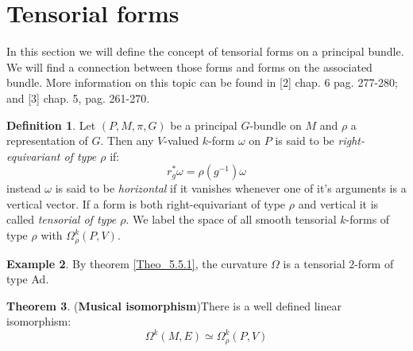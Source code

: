\documentclass[12pt,a4paper]{report}
\theoremstyle{definition}
\newtheorem{Def}{Definition}[chapter]
\theoremstyle{Theorem}
\newtheorem{Theo}[Def]{Theorem}
\theoremstyle{definition}
\newtheorem{Ex}[Def]{Example}
\theoremstyle{definition}
\begin{document}
	\section{Tensorial forms}
	In this section we will define the concept of tensorial forms on a principal bundle. We will find a connection between those forms and forms on the associated bundle. More information on this topic can be found in [2] chap. 6 pag. 277-280; and [3] chap. 5, pag. 261-270.
	\begin{Def}
		Let $(P,M,\pi,G)$ be a principal $G$-bundle on $M$ and $\rho$ a representation of $G$.  Then any $V$-valued $k$-form $\omega$ on $P$ is said to be \textit{right-equivariant of type $\rho$} if:
		$$r^*_g\omega=\rho(g^{-1})\omega$$
		instead $\omega$ is said to be \textit{horizontal} if it vanishes whenever one of it's arguments is a vertical vector. If a form is both right-equivariant of type $\rho$ and vertical it is called \textit{tensorial of type $\rho$}. We label the space of all smooth tensorial $k$-forms of type $\rho$ with $\Omega^k_\rho(P,V)$.
	\end{Def}
	\begin{Ex}
		By theorem \ref{Theo_5.5.1}, the curvature $\Omega$ is a tensorial $2$-form of type Ad.
	\end{Ex}
	\begin{Theo}(\textbf{Musical isomorphism})\label{Mus_Iso}
		There is a well defined linear isomorphism:
		$$\Omega^k(M,E)\simeq \Omega^k_\rho(P,V)$$
	\end{Theo}
\end{document}
